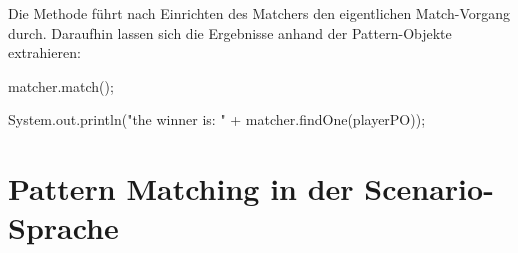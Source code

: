 Die Methode  führt nach Einrichten des Matchers den eigentlichen Match-Vorgang durch.
Daraufhin lassen sich die Ergebnisse anhand der Pattern-Objekte extrahieren:

\begin{jcodeblock}
    matcher.match();

    System.out.println("the winner is: " + matcher.findOne(playerPO));
\end{jcodeblock}


\section{Pattern Matching in der Scenario-Sprache}\label{sec:scenario-pattern-matching}

